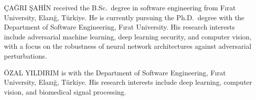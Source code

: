 \documentclass{ieeeaccess}
\begin{document}
\begin{IEEEbiographynophoto}{\c{C}A\u{G}RI \c{S}AH\.IN}
received the B.Sc.\ degree in software engineering from F{\i}rat University, Elaz{\i}\u{g}, T\"urkiye. He is currently pursuing the Ph.D.\ degree with the Department of Software Engineering, F{\i}rat University. His research interests include adversarial machine learning, deep learning security, and computer vision, with a focus on the robustness of neural network architectures against adversarial perturbations.
\end{IEEEbiographynophoto}

\begin{IEEEbiographynophoto}{\"OZAL YILDIRIM}
is with the Department of Software Engineering, F{\i}rat University, Elaz{\i}\u{g}, T\"urkiye. His research interests include deep learning, computer vision, and biomedical signal processing.
\end{IEEEbiographynophoto}

\EOD
\end{document}
